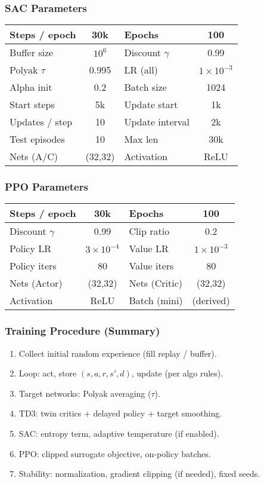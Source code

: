 \begin{frame}
  \frametitle{SAC Parameters}
  \scriptsize
  \begin{tabular}{|l|c||l|c|}
  \hline
  Steps / epoch & 30k & Epochs & 100 \\ \hline
  Buffer size & $10^{6}$ & Discount $\gamma$ & 0.99 \\ \hline
  Polyak $\tau$ & 0.995 & LR (all) & $1\!\times\!10^{-3}$ \\ \hline
  Alpha init & 0.2 & Batch size & 1024 \\ \hline
  Start steps & 5k & Update start & 1k \\ \hline
  Updates / step & 10 & Update interval & 2k \\ \hline
  Test episodes & 10 & Max len & 30k \\ \hline
  Nets (A/C) & (32,32) & Activation & ReLU \\ \hline
  \end{tabular}
\end{frame}

\begin{frame}
  \frametitle{PPO Parameters}
  \scriptsize
  \begin{tabular}{|l|c||l|c|}
  \hline
  Steps / epoch & 30k & Epochs & 100 \\ \hline
  Discount $\gamma$ & 0.99 & Clip ratio & 0.2 \\ \hline
  Policy LR & $3\!\times\!10^{-4}$ & Value LR & $1\!\times\!10^{-3}$ \\ \hline
  Policy iters & 80 & Value iters & 80 \\ \hline
  Nets (Actor) & (32,32) & Nets (Critic) & (32,32) \\ \hline
  Activation & ReLU & Batch (mini) & (derived) \\ \hline
  \end{tabular}
\end{frame}

\begin{frame}
  \frametitle{Training Procedure (Summary)}
  \small
  \begin{enumerate}\setlength{\itemsep}{2pt}
    \item Collect initial random experience (fill replay / buffer).
    \item Loop: act, store $(s,a,r,s',d)$, update (per algo rules).
    \item Target networks: Polyak averaging ($\tau$).
    \item TD3: twin critics + delayed policy + target smoothing.
    \item SAC: entropy term, adaptive temperature (if enabled).
    \item PPO: clipped surrogate objective, on-policy batches.
    \item Stability: normalization, gradient clipping (if needed), fixed seeds.
  \end{enumerate}
\end{frame}

